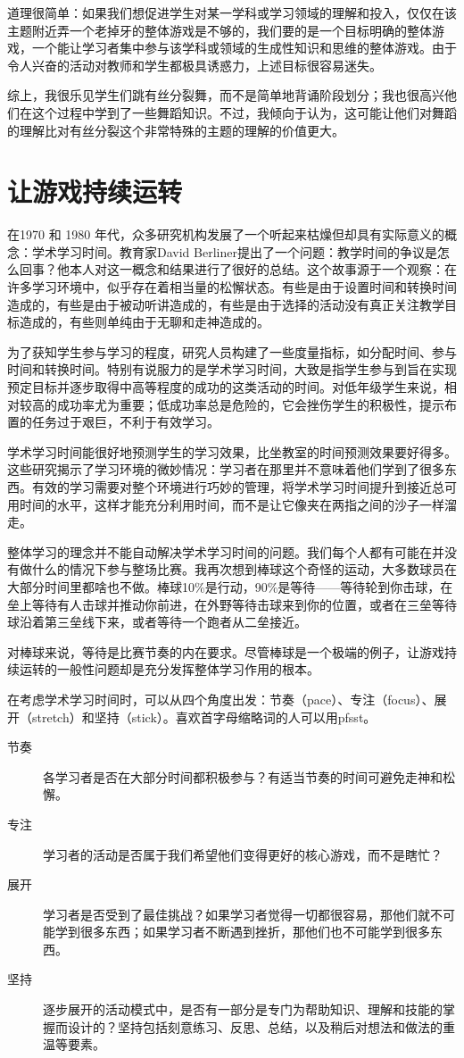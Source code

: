 道理很简单：如果我们想促进学生对某一学科或学习领域的理解和投入，仅仅在该主题附近弄一个老掉牙的整体游戏是不够的，我们要的是一个目标明确的整体游戏，一个能让学习者集中参与该学科或领域的生成性知识和思维的整体游戏。由于令人兴奋的活动对教师和学生都极具诱惑力，上述目标很容易迷失。

综上，我很乐见学生们跳有丝分裂舞，而不是简单地背诵阶段划分；我也很高兴他们在这个过程中学到了一些舞蹈知识。不过，我倾向于认为，这可能让他们对舞蹈的理解比对有丝分裂这个非常特殊的主题的理解的价值更大。

\section*{让游戏持续运转}

在1970 和 1980 年代，众多研究机构发展了一个听起来枯燥但却具有实际意义的概念：学术学习时间。教育家David Berliner提出了一个问题：教学时间的争议是怎么回事？他本人对这一概念和结果进行了很好的总结。这个故事源于一个观察：在许多学习环境中，似乎存在着相当量的松懈状态。有些是由于设置时间和转换时间造成的，有些是由于被动听讲造成的，有些是由于选择的活动没有真正关注教学目标造成的，有些则单纯由于无聊和走神造成的。

为了获知学生参与学习的程度，研究人员构建了一些度量指标，如分配时间、参与时间和转换时间。特别有说服力的是学术学习时间，大致是指学生参与到旨在实现预定目标并逐步取得中高等程度的成功的这类活动的时间。对低年级学生来说，相对较高的成功率尤为重要；低成功率总是危险的，它会挫伤学生的积极性，提示布置的任务过于艰巨，不利于有效学习。

学术学习时间能很好地预测学生的学习效果，比坐教室的时间预测效果要好得多。这些研究揭示了学习环境的微妙情况：学习者在那里并不意味着他们学到了很多东西。有效的学习需要对整个环境进行巧妙的管理，将学术学习时间提升到接近总可用时间的水平，这样才能充分利用时间，而不是让它像夹在两指之间的沙子一样溜走。

整体学习的理念并不能自动解决学术学习时间的问题。我们每个人都有可能在并没有做什么的情况下参与整场比赛。我再次想到棒球这个奇怪的运动，大多数球员在大部分时间里都啥也不做。棒球10\%是行动，90\%是等待——等待轮到你击球，在垒上等待有人击球并推动你前进，在外野等待击球来到你的位置，或者在三垒等待球沿着第三垒线下来，或者等待一个跑者从二垒接近。

对棒球来说，等待是比赛节奏的内在要求。尽管棒球是一个极端的例子，让游戏持续运转的一般性问题却是充分发挥整体学习作用的根本。

在考虑学术学习时间时，可以从四个角度出发：节奏（pace）、专注（focus）、展开（stretch）和坚持（stick）。喜欢首字母缩略词的人可以用pfsst。
\begin{description}
    \item[节奏] 各学习者是否在大部分时间都积极参与？有适当节奏的时间可避免走神和松懈。
    \item[专注] 学习者的活动是否属于我们希望他们变得更好的核心游戏，而不是瞎忙？
    \item[展开] 学习者是否受到了最佳挑战？如果学习者觉得一切都很容易，那他们就不可能学到很多东西；如果学习者不断遇到挫折，那他们也不可能学到很多东西。
    \item[坚持] 逐步展开的活动模式中，是否有一部分是专门为帮助知识、理解和技能的掌握而设计的？坚持包括刻意练习、反思、总结，以及稍后对想法和做法的重温等要素。
\end{description}

